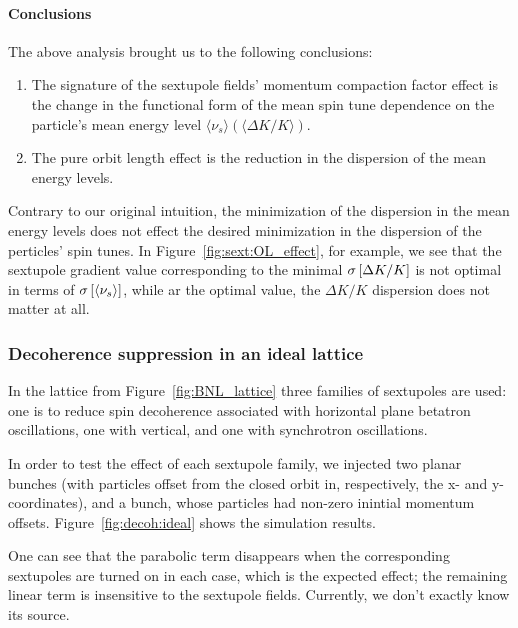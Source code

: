 \documentclass[]{elsarticle}
\newcommand{\D}{\Delta}
\newcommand{\SD}[1]{\sigma\bkt*{#1}}
\newcommand{\avg}[1]{\langle{#1}\rangle}
\begin{document}
\paragraph{Conclusions}
The above analysis brought us to the following conclusions:
\begin{enumerate}[(1)]
\item The signature of the sextupole fields' momentum compaction factor effect is the change in the functional
  form of the mean spin tune dependence on the particle's mean energy level $\avg{\nu_s}(\avg{\D K/K})$.
  \item The pure orbit length effect is the reduction in the dispersion of the mean energy levels.
\end{enumerate}

Contrary to our original intuition, the minimization of the dispersion in the mean energy levels does not
effect the desired minimization in the dispersion of the perticles' spin tunes.
In Figure~\ref{fig:sext:OL_effect}, for example, we see that the sextupole gradient value corresponding to the
minimal $\SD{\D K/K}$ is not optimal in terms of $\SD{\avg{\nu_s}}$, while ar the optimal value,
the $\D K/K$ dispersion does not matter at all.

\subsubsection{Decoherence suppression in an ideal lattice}
In the lattice from Figure~\ref{fig:BNL_lattice} three families of sextupoles are used: one is to reduce spin
decoherence associated with horizontal plane betatron oscillations, one with vertical, and one with synchrotron
oscillations.

In order to test the effect of each sextupole family, we injected two planar bunches
(with particles offset from the closed orbit in, respectively, the x- and y-coordinates), and
a bunch, whose particles had non-zero inintial momentum offsets. Figure~\ref{fig:decoh:ideal}
shows the simulation results.

One can see that the parabolic term disappears when the corresponding sextupoles are turned on in each case,
which is the expected effect; the remaining linear term is insensitive to the sextupole fields. Currently,
we don't exactly know its source.
\end{document}
